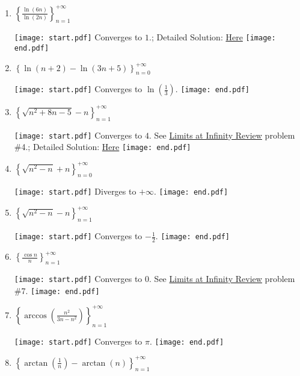 \documentclass[12pt]{article}
\begin{document}
\begin{enumerate}
\item $\left\{ \frac{\ln{(6n)}}{\ln{(2n)}} \right\}_{n = 1}^{+\infty}$

\texttt{[image: start.pdf]}
{{Converges to $1$.; Detailed Solution: \textcolor{blue}{\href{http://www.math.drexel.edu/classes/Calculus/resources/Math123HW/Solutions/123_05_Sequences_26.pdf}{Here}}}}
\texttt{[image: end.pdf]}


\item $\left\{ \ln{(n+2)} - \ln{(3n+5)} \right\}_{n = 0}^{+\infty}$

\texttt{[image: start.pdf]}
{{Converges to $\ln{\left(\frac{1}{3}\right)}$.}}
\texttt{[image: end.pdf]}


\item $\left\{ \sqrt{n^2+8n-5}-n \right\}_{n = 1}^{+\infty}$

\texttt{[image: start.pdf]}
{{Converges to $4$.  See \underline{Limits at Infinity Review} problem \#4.; Detailed Solution: \textcolor{blue}{\href{http://www.math.drexel.edu/classes/Calculus/resources/Math123HW/Solutions/123_05_Sequences_28.pdf}{Here}}}}
\texttt{[image: end.pdf]}



\item $\left\{ \sqrt{n^2-n} + n \right\}_{n = 0}^{+\infty}$

\texttt{[image: start.pdf]}
{{Diverges to $+\infty$.}}
\texttt{[image: end.pdf]}


\item $\left\{ \sqrt{n^2-n} - n \right\}_{n = 1}^{+\infty}$

\texttt{[image: start.pdf]}
{{Converges to $-\frac{1}{2}$.}}
\texttt{[image: end.pdf]}


\item $\left\{ \frac{\cos{n}}{n} \right\}_{n = 1}^{+\infty}$

\texttt{[image: start.pdf]}
{{Converges to $0$.  See \underline{Limits at Infinity Review} problem \#7.}}
\texttt{[image: end.pdf]}


\item $\left\{\arccos\left(\frac{n^2}{3n-n^2}\right) \right\}_{n = 1}^{+\infty}$

\texttt{[image: start.pdf]}
{{Converges to $\pi$.}}
\texttt{[image: end.pdf]}


\item $\left\{ \arctan\left({\frac{1}{n}}\right) - \arctan{(n)}  \right\}_{n = 1}^{+\infty}$


\end{enumerate}
\end{document}
